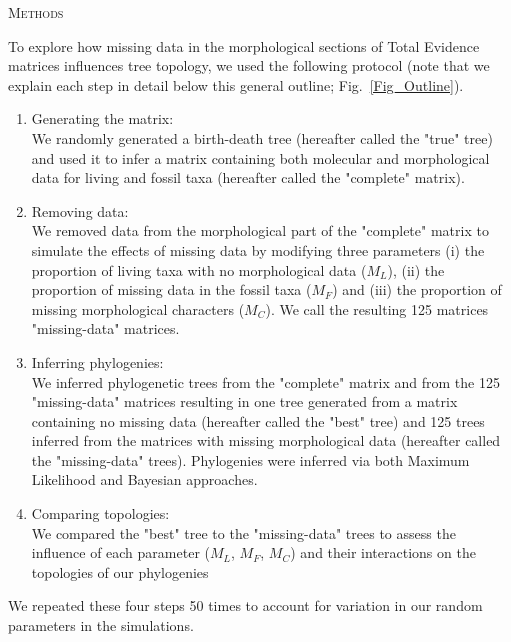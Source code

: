 \documentclass[12pt,letterpaper]{article}
\renewcommand{\section}[1]{%
\bigskip
\begin{center}
\begin{Large}
\normalfont\scshape #1
\medskip
\end{Large}
\end{center}}
\begin{document}
%
%
 
\newpage

\section{Methods}
To explore how missing data in the morphological sections of Total Evidence matrices influences tree topology, we used the following protocol (note that we explain each step in detail below this general outline; Fig.~\ref{Fig_Outline}).
\begin{enumerate}
\item{Generating the matrix:} \label{step:generate_matrix} \\
We randomly generated a birth-death tree (hereafter called the "true" tree) and used it to infer a matrix containing both molecular and morphological data for living and fossil taxa (hereafter called the "complete" matrix).
\item{Removing data:} \label{step:remove_data} \\
We removed data from the morphological part of the "complete" matrix to simulate the effects of missing data by modifying three parameters (i) the proportion of living taxa with no morphological data ($M_{L}$), (ii) the proportion of missing data in the fossil taxa ($M_{F}$) and (iii) the proportion of missing morphological characters ($M_{C}$). We call the resulting 125 matrices "missing-data" matrices.
\item{Inferring phylogenies:} \label{step:build_phylo} \\
We inferred phylogenetic trees from the "complete" matrix and from the 125 "missing-data" matrices resulting in one tree generated from a matrix containing no missing data (hereafter called the "best" tree) and 125 trees inferred from the matrices with missing morphological data (hereafter called the "missing-data" trees). Phylogenies were inferred via both Maximum Likelihood and Bayesian approaches.
\item{Comparing topologies:} \label{step:compare_topo} \\
We compared the "best" tree to the "missing-data" trees to assess the influence of each parameter ($M_{L}$, $M_{F}$, $M_{C}$) and their interactions on the topologies of our phylogenies
\end{enumerate}
We repeated these four steps 50 times to account for variation in our random parameters in the simulations.
\end{document}
